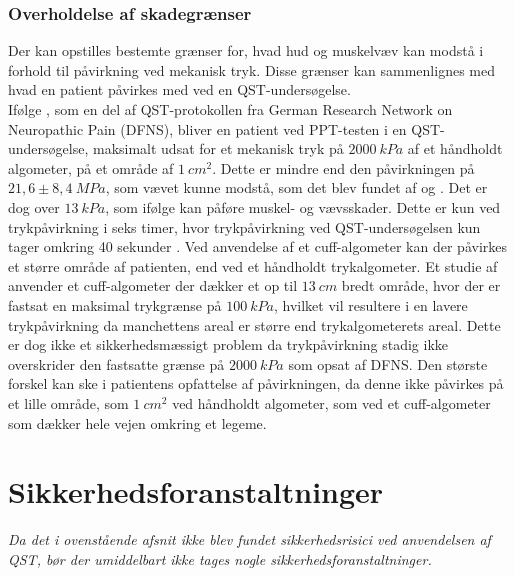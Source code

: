 \subsubsection{Overholdelse af skadegrænser}
Der kan opstilles bestemte grænser for, hvad hud og muskelvæv kan modstå i forhold til påvirkning ved mekanisk tryk. Disse grænser kan sammenlignes med hvad en patient påvirkes med ved en QST-undersøgelse. \\
Ifølge , som en del af QST-protokollen fra German Research Network on Neuropathic Pain (DFNS), bliver en patient ved PPT-testen i en QST-undersøgelse, maksimalt udsat for et mekanisk tryk på $2000~kPa$ af et håndholdt algometer, på et område af $1~cm^{2}$. Dette er mindre end den påvirkningen på $21,6 \pm 8,4~MPa$, som vævet kunne modstå, som det blev fundet af  og . Det er dog over $13~kPa$, som ifølge  kan påføre muskel- og vævsskader. Dette er kun ved trykpåvirkning i seks timer, hvor trykpåvirkning ved QST-undersøgelsen kun tager omkring 40 sekunder \cite{Rolke2006b}. Ved anvendelse af et cuff-algometer kan der påvirkes et større område af patienten, end ved et håndholdt trykalgometer. Et studie af  anvender et cuff-algometer der dækker et op til $13~cm$ bredt område, hvor der er fastsat en maksimal trykgrænse på $100~kPa$, hvilket vil resultere i en lavere trykpåvirkning da manchettens areal er større end trykalgometerets areal. 
Dette er dog ikke et sikkerhedsmæssigt problem da trykpåvirkning stadig ikke overskrider den fastsatte grænse på $2000~kPa$ som opsat af DFNS. Den største forskel kan ske i patientens opfattelse af påvirkningen, da denne ikke påvirkes på et lille område, som $1~cm^{2}$ ved håndholdt algometer, som ved et cuff-algometer som dækker hele vejen omkring et legeme. %



\section{Sikkerhedsforanstaltninger}
\textit{Da det i ovenstående afsnit ikke blev fundet sikkerhedsrisici ved anvendelsen af QST, bør der umiddelbart ikke tages nogle sikkerhedsforanstaltninger.} 



